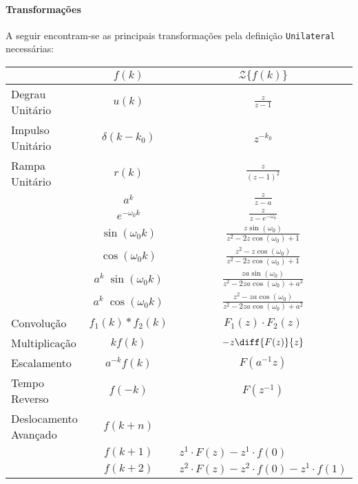 \documentclass{article}
\begin{document}
    \paragraph{Transformações}A seguir encontram-se as principais transformações pela definição \texttt{Unilateral} necessárias:
    \begin{table}[H]
        \centering\begingroup
        \renewcommand{\arraystretch}{1.5}
        \begin{tabular}[]{lcc}
                                & $f(k)$      & $\mathcal{Z}\{ f(k) \}$\\\hline
            Degrau Unitário     & $u(k)$      & $\frac{z}{z-1}$\\
            Impulso Unitário    & $\delta(k-k_0)$ & $z^{-k_0}$\\
            Rampa Unitário      & $r(k)$      & $\frac{z}{(z-1)^2}$\\
                                & $a^{k}$     & $\frac{z}{z-a}$\\
                                & $e^{-\omega_0k}$  & $\frac{z}{z-e^{-\omega_0}}$\\
                                & $\sin(\omega_0 k)$ & $\frac{z\sin(\omega_0)}{z^2 - 2z\cos(\omega_0) + 1}$\\
                                & $\cos(\omega_0 k)$ & $\frac{z^2 - z\cos(\omega_0)}{z^2 - 2z\cos(\omega_0) + 1}$\\
                                & $a^k\;\sin(\omega_0 k)$ & $\frac{za\sin(\omega_0)}{z^2 - 2za\cos(\omega_0) + a^2}$\\
                                & $a^k\;\cos(\omega_0 k)$ & $\frac{z^2 - za\cos(\omega_0)}{z^2 - 2za\cos(\omega_0) + a^2}$\\
            Convolução          & $f_1(k) * f_2(k)$ & $F_1(z)\cdot F_2(z)$\\
            Multiplicação       & $k f(k)$ & $-z \diff{F(z)}{z}$\\
            Escalamento         & $a^{-k}f(k)$ & $F(a^{-1}z)$\\
            Tempo Reverso       & $f(-k)$ & $F(z^{-1})$\\
            Deslocamento Avançado & $f(k+n)$ &\\
                                  & $f(k+1)$ & \multicolumn{1}{l}{$z^1\cdot F(z) - z^1\cdot f(0)$}\\
                                  & $f(k+2)$ & \multicolumn{1}{l}{$z^2\cdot F(z) - z^2\cdot f(0) - z^1\cdot f(1)$}\\

\end{tabular}
\end{table}
\end{document}
